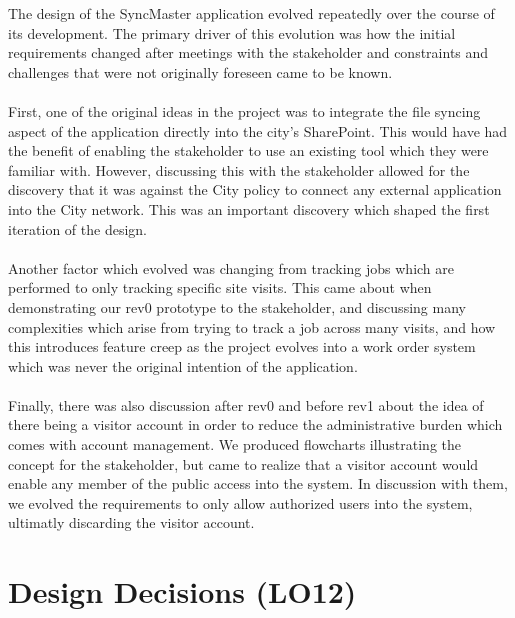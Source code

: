 \documentclass{article}
\begin{document}
The design of the SyncMaster application evolved repeatedly over the course of its development.
The primary driver of this evolution was how the initial requirements changed after meetings with the stakeholder
and constraints and challenges that were not originally foreseen came to be known.\\
\\
First, one of the original ideas in the project was to integrate the file syncing aspect of the application directly into the city's
SharePoint. This would have had the benefit of enabling the stakeholder to use an existing tool which they were familiar with.
However, discussing this with the stakeholder allowed for the discovery that it was against the City policy to connect any
external application into the City network. This was an important discovery which shaped the first iteration of the design.\\
\\
Another factor which evolved was changing from tracking jobs which are performed to only tracking specific site visits. This
came about when demonstrating our rev0 prototype to the stakeholder, and discussing many complexities which arise from trying
to track a job across many visits, and how this introduces feature creep as the project evolves into a work order system which
was never the original intention of the application.\\
\\
Finally, there was also discussion after rev0 and before rev1 about the idea of there being a visitor account in order to
reduce the administrative burden which comes with account management. We produced flowcharts illustrating the concept for the
stakeholder, but came to realize that a visitor account would enable any member of the public access into the system. In discussion
with them, we evolved the requirements to only allow authorized users into the system, ultimatly discarding the visitor account.

\section{Design Decisions (LO12)}
\end{document}
